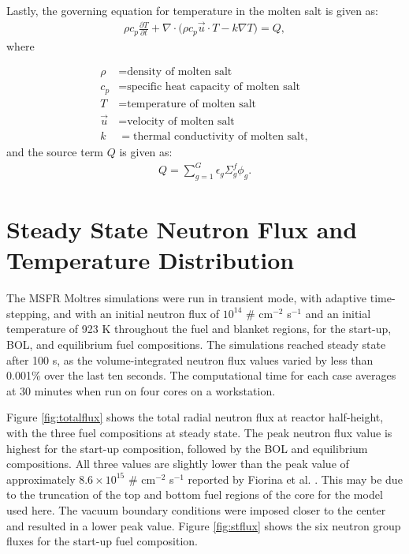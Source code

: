 \documentclass{anstrans}
\begin{document}
	Lastly, the governing equation for temperature in the molten salt is given
	as:
%
\begin{align}
	\rho c_{p} \frac{\partial T}{\partial t} + \nabla \cdot \big( \rho
	c_{p} \overrightarrow{u} \cdot T - k \nabla T \big) = Q,
	\label{eq3}
\end{align}
%
	where
{\small
\begin{align}
	\rho &= \text{density of molten salt} \\
	 c_{p} &= \text{specific heat capacity of molten salt} \\
	 T &= \text{temperature of molten salt} \\
	 \overrightarrow{u} &= \text{velocity of molten salt} \\
	 k &= \text{thermal conductivity of molten salt},
\end{align}
	and the source term $Q$ is given as:
%
\begin{align}
Q = \sum^G_{g=1} \epsilon_g \Sigma_g^f \phi_g. \label{eq4}
\end{align}

\section{Steady State Neutron Flux and Temperature Distribution}

	The \gls{MSFR} Moltres simulations were run in transient mode, with
	adaptive time-stepping, and with an
	initial neutron flux of $10^{14}$
	\# cm$^{-2}$ s$^{-1}$ and an initial temperature of 923 K throughout the
	fuel and blanket regions, for the start-up, \gls{BOL}, and equilibrium
	fuel compositions. The simulations reached steady state after 100 s, as the
	volume-integrated neutron flux values varied by less than 0.001\% over the
	last ten seconds. The computational time for each case averages at 30
	minutes when run on four cores on a workstation.
	
	Figure \ref{fig:totalflux} shows the total radial neutron flux at reactor
	half-height, with the three fuel compositions at steady state. 
	The peak neutron flux value is highest for the start-up composition,
	followed by the \gls{BOL} and equilibrium compositions. All three values
	are slightly lower than the peak value of approximately
	$8.6 \times 10^{15}$ \# cm$^{-2}$ s$^{-1}$ reported by Fiorina et al.
	\cite{fiorina_investigation_2013}. This may be due to the truncation of
	the top and bottom fuel regions of the core for the model used here.
	The vacuum boundary conditions were imposed closer to the center and
	resulted in a lower peak value. Figure \ref{fig:stflux} shows the six
	neutron group fluxes for the start-up fuel composition.
	
}
\end{document}
